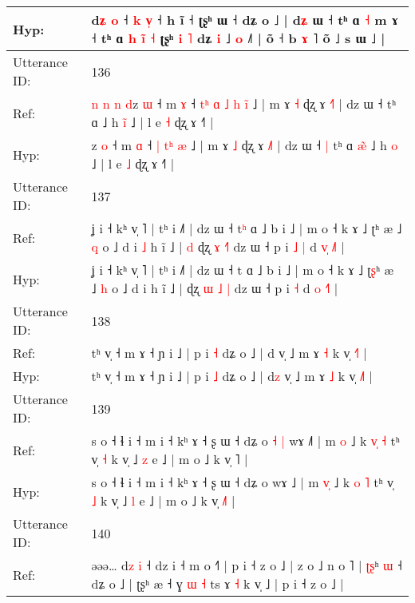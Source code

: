 \documentclass[10pt]{article}
\DeclareRobustCommand{\hl}[1]{{\textcolor{red}{#1}}}
\begin{document}
\begin{longtable}{ll}
 \\
Hyp: & d\hl{ʑ} \hl{o} ˧ \hl{k} \hl{v}\hl{̩} ˧ h ĩ ˧ ʈʂʰ ɯ ˧ dʑ o ˩ | d\hl{ʑ} ɯ ˧ tʰ ɑ\hl{}\hl{} \hl{˧} m ɤ ˧ tʰ ɑ\hl{ }\hl{h} \hl{i}\hl{̃} \hl{˧} ʈʂʰ \hl{i} \hl{˥} dʑ \hl{i} ˩\hl{}\hl{} \hl{}\hl{o} ˩˥ | õ ˧ b \hl{}\hl{ɤ} ˥ õ ˩ s ɯ ˩ |
 \\
\midrule
Utterance ID: & 136 \\
Ref: & \hl{n}\hl{ }\hl{n}\hl{ }\hl{n}\hl{ }\hl{d}z \hl{ɯ} ˧ m \hl{ɤ} ˧\hl{ }\hl{t}\hl{ʰ} \hl{ɑ} \hl{˩}\hl{ }\hl{h} \hl{i}\hl{̃} ˩ | m ɤ \hl{˧} ɖʐ ɤ \hl{˧}˥ | dz ɯ ˧\hl{}\hl{} tʰ ɑ\hl{}\hl{}\hl{} ˩ h \hl{i}\hl{̃} ˩ | l e \hl{˧} ɖʐ ɤ ˧˥ |
 \\
Hyp: & \hl{}\hl{}\hl{}\hl{}\hl{}\hl{}\hl{}z \hl{o} ˧ m \hl{ɑ} ˧\hl{}\hl{}\hl{} \hl{|} \hl{}\hl{t}\hl{ʰ} \hl{}\hl{æ} ˩ | m ɤ \hl{˩} ɖʐ ɤ \hl{˩}˥ | dz ɯ ˧\hl{ }\hl{|} tʰ ɑ\hl{ }\hl{æ}\hl{̃} ˩ h \hl{}\hl{o} ˩ | l e \hl{˩} ɖʐ ɤ ˧˥ |
 \\
\midrule
Utterance ID: & 137 \\
Ref: & ʝ i ˧ kʰ v̩ ˥ | tʰ i ˩˥ | dz ɯ ˧ t\hl{ʰ} ɑ ˩ b i ˩ | m o ˧ k ɤ ˩ ʈ\hl{}ʰ æ ˩ \hl{q} o ˩ d i\hl{ }\hl{˩} h ĩ ˩ |\hl{ }\hl{d} ɖʐ \hl{ɤ} \hl{}\hl{˧}\hl{˥} dz ɯ ˧ p i\hl{ }\hl{˩} \hl{|} d \hl{v}\hl{̩} \hl{˩}˥ |
 \\
Hyp: & ʝ i ˧ kʰ v̩ ˥ | tʰ i ˩˥ | dz ɯ ˧ t\hl{} ɑ ˩ b i ˩ | m o ˧ k ɤ ˩ ʈ\hl{ʂ}ʰ æ ˩ \hl{h} o ˩ d i\hl{}\hl{} h ĩ ˩ |\hl{}\hl{} ɖʐ \hl{ɯ} \hl{˩}\hl{ }\hl{|} dz ɯ ˧ p i\hl{}\hl{} \hl{˧} d \hl{}\hl{o} \hl{˧}˥ |
 \\
\midrule
Utterance ID: & 138 \\
Ref: & tʰ v̩ ˧ m ɤ ˧ ɲ i ˩ | p i \hl{˧} dʑ o ˩ | d\hl{} v̩ ˩ m ɤ \hl{˧} k v̩ \hl{˧}˥ |
 \\
Hyp: & tʰ v̩ ˧ m ɤ ˧ ɲ i ˩ | p i \hl{˩} dʑ o ˩ | d\hl{z} v̩ ˩ m ɤ \hl{˩} k v̩ \hl{˩}˥ |
 \\
\midrule
Utterance ID: & 139 \\
Ref: & s o ˧ ɬ i ˧ m i ˧ kʰ ɤ ˧ ʂ ɯ ˧ dʑ o\hl{ }\hl{˧}\hl{ }\hl{|} wɤ ˩\hl{˥} | m \hl{}\hl{o} ˩ k \hl{v}\hl{̩} \hl{˧} tʰ v̩ \hl{˧} k v̩ ˩ \hl{z} e ˩ | m o ˩ k v̩ \hl{}˥ |
 \\
Hyp: & s o ˧ ɬ i ˧ m i ˧ kʰ ɤ ˧ ʂ ɯ ˧ dʑ o\hl{}\hl{}\hl{}\hl{} wɤ ˩\hl{} | m \hl{v}\hl{̩} ˩ k \hl{}\hl{o} \hl{˥} tʰ v̩ \hl{˩} k v̩ ˩ \hl{l} e ˩ | m o ˩ k v̩ \hl{˩}˥ |
 \\
\midrule
Utterance ID: & 140 \\
Ref: & əəə… d\hl{z} \hl{i} ˧ dz i ˧ m o ˧\hl{}\hl{}\hl{}\hl{}\hl{}\hl{˥} | p i ˧ z o ˩ | z o ˩ n o ˥ | \hl{ʈ}\hl{ʂ}ʰ \hl{}\hl{ɯ} ˧ dʑ o ˩ | ʈʂʰ æ ˧ ɣ \hl{ɯ} \hl{˧} ts ɤ \hl{˧} k v̩ ˩ | p i ˧ z o ˩ |

\end{longtable}
\end{document}
